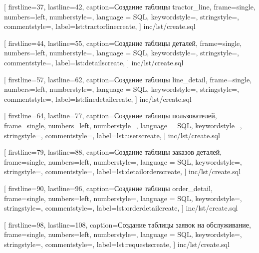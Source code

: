 
[
    firstline=37,
    lastline=42,
    caption=Создание таблицы tractor\_line,
    frame=single,
    numbers=left,
	numberstyle=\footnotesize\color{numbers},
    language = SQL,
    keywordstyle=\color{keywords},
	stringstyle=\color{strings},
	commentstyle=\color{comments},
    label={lst:tractorlinecreate},
]
{inc/lst/create.sql}



[
    firstline=44,
    lastline=55,
    caption=Создание таблицы деталей,
    frame=single,
    numbers=left,
	numberstyle=\footnotesize\color{numbers},
    language = SQL,
    keywordstyle=\color{keywords},
	stringstyle=\color{strings},
	commentstyle=\color{comments},
    label={lst:detailscreate},
]
{inc/lst/create.sql}


[
    firstline=57,
    lastline=62,
    caption=Создание таблицы line\_detail,
    frame=single,
    numbers=left,
	numberstyle=\footnotesize\color{numbers},
    language = SQL,
    keywordstyle=\color{keywords},
	stringstyle=\color{strings},
	commentstyle=\color{comments},
    label={lst:linedetailcreate},
]
{inc/lst/create.sql}


[
    firstline=64,
    lastline=77,
    caption=Создание таблицы пользователей,
    frame=single,
    numbers=left,
	numberstyle=\footnotesize\color{numbers},
    language = SQL,
    keywordstyle=\color{keywords},
	stringstyle=\color{strings},
	commentstyle=\color{comments},
    label={lst:userscreate},
]
{inc/lst/create.sql}


[
    firstline=79,
    lastline=88,
    caption=Создание таблицы заказов деталей,
    frame=single,
    numbers=left,
	numberstyle=\footnotesize\color{numbers},
    language = SQL,
    keywordstyle=\color{keywords},
	stringstyle=\color{strings},
	commentstyle=\color{comments},
    label={lst:detailorderscreate},
]
{inc/lst/create.sql}


[
    firstline=90,
    lastline=96,
    caption=Создание таблицы order\_detail,
    frame=single,
    numbers=left,
	numberstyle=\footnotesize\color{numbers},
    language = SQL,
    keywordstyle=\color{keywords},
	stringstyle=\color{strings},
	commentstyle=\color{comments},
    label={lst:orderdetailcreate},
]
{inc/lst/create.sql}


[
    firstline=98,
    lastline=108,
    caption=Создание таблицы заявок на обслуживание,
    frame=single,
    numbers=left,
	numberstyle=\footnotesize\color{numbers},
    language = SQL,
    keywordstyle=\color{keywords},
	stringstyle=\color{strings},
	commentstyle=\color{comments},
    label={lst:requestscreate},
]
{inc/lst/create.sql}

